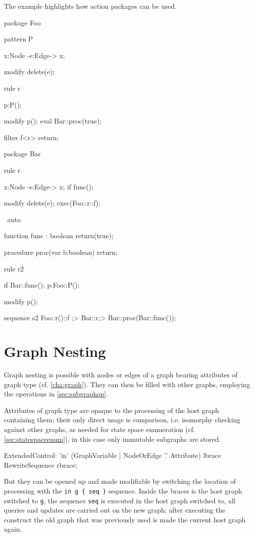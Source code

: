 \begin{example}
The example highlights how action packages can be used.
	\begin{grgen}
package Foo {
	pattern P {
		x:Node -e:Edge-> x;

		modify {
			delete(e);
		}
	}
	
	rule r {
		p:P();

		modify {
			p();
			eval { Bar::proc(true); }
		}
	}
	
	filter f<r> {
		return;
	}
}

package Bar {
	rule r {
		x:Node -e:Edge-> x;
		if{ func(); }

		modify {
			delete(e);
			exec(Foo::r\Foo::f);
		}
	} \ auto
		
	function func : boolean {
		return(true);
	}
	
	procedure proc(var b:boolean) {
		return;
	}	
}

rule r2 {
	if{ Bar::func(); }
	p:Foo::P();
	
	modify {
		p();
	}
}

sequence s2 {
	Foo::r()\Foo::f ;> Bar::r\auto ;> { Bar::proc(Bar::func()); }
}
	\end{grgen}
\end{example}

\section{Graph Nesting}\label{sec:graphnesting}

Graph nesting is possible with nodes or edges of a graph bearing attributes of graph type (cf. \ref{cha:graph}).
They can then be filled with other graphs, employing the operations in \ref{sec:subgraphop}.

Attributes of graph type are opaque to the processing of the host graph containing them; 
their only direct usage is comparison, i.e. isomorphy checking against other graphs,
as needed for state space enumeration (cf. \ref{sec:statespaceenum}),
in this case only immutable subgraphs are stored.

\begin{rail} 
  ExtendedControl: 
    'in' (GraphVariable | NodeOrEdge '.' Attribute) lbrace RewriteSequence rbrace;
\end{rail}

But they can be opened up and made modifiable by switching the location of processing with the \verb#in g { seq }# sequence.
Inside the braces is the host graph switched to \texttt{g}, the sequence \texttt{seq} is executed in the host graph switched to, all queries and updates are carried out on the new graph; after executing the construct the old graph that was previously used is made the current host graph again.

